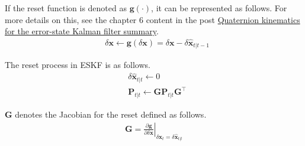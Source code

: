 \documentclass[10pt]{article}
\begin{document}
	If the reset function is denoted as $\mathbf{g}(\cdot)$, it can be represented as follows. For more details on this, see the chapter 6 content in the post \href{https://alida.tistory.com/63#6.3-eskf-reset}{Quaternion kinematics for the error-state Kalman filter summary}.
	\begin{equation}
	\begin{aligned}
		& \delta \mathbf{x} \leftarrow \mathbf{g}(\delta \mathbf{x}) =  \delta \mathbf{x} - \delta \hat{\mathbf{x}}_{t|t-1}
	\end{aligned}
	\end{equation}
	
	The reset process in ESKF is as follows.
	\begin{equation}
	\begin{aligned}
		& \delta \hat{\mathbf{x}}_{t|t} \leftarrow 0 \\
		& \mathbf{P}_{t|t} \leftarrow \mathbf{G}\mathbf{P}_{t|t}\mathbf{G}^{\intercal}
	\end{aligned}
	\end{equation}
	
	$\mathbf{G}$ denotes the Jacobian for the reset defined as follows.
	\begin{equation}
	\begin{aligned}
		\mathbf{G} = \left. \frac{\partial \mathbf{g}}{\partial \delta \mathbf{x}}\right\vert_{\delta \mathbf{x}_{t}=\delta \hat{\mathbf{x}}_{t|t}}
	\end{aligned}
	\end{equation}
	
	
\end{document}
